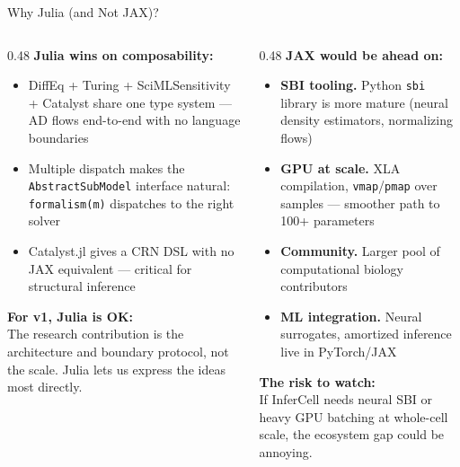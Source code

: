 \documentclass[aspectratio=169]{beamer}
\newcommand{\backupend}{
	\setcounter{framenumber}{\value{framenumberappendix}}
}
\begin{document}

\begin{frame}[noframenumbering]{Why Julia (and Not JAX)?}
	\small
	\begin{columns}[T]
		\begin{column}{0.48\textwidth}
			\textbf{Julia wins on composability:}
			\scriptsize
			\begin{itemize}\itemsep3pt
				\item DiffEq + Turing + SciMLSensitivity + Catalyst share one type system --- AD flows end-to-end with no language boundaries
				\item Multiple dispatch makes the \texttt{AbstractSubModel} interface natural: \texttt{formalism(m)} dispatches to the right solver
				\item Catalyst.jl gives a CRN DSL with no JAX equivalent --- critical for structural inference
			\end{itemize}

			\textbf{For v1, Julia is OK:}\\
			{\scriptsize The research contribution is the architecture and boundary protocol, not the scale. Julia lets us express the ideas most directly.}
		\end{column}
		\begin{column}{0.48\textwidth}
			\textbf{JAX would be ahead on:}
			\scriptsize
			\begin{itemize}\itemsep3pt
				\item \textbf{SBI tooling.} Python \texttt{sbi} library is more mature (neural density estimators, normalizing flows)
				\item \textbf{GPU at scale.} XLA compilation, \texttt{vmap}/\texttt{pmap} over samples --- smoother path to 100+ parameters
				\item \textbf{Community.} Larger pool of computational biology contributors
				\item \textbf{ML integration.} Neural surrogates, amortized inference live in PyTorch/JAX
			\end{itemize}

			\medskip
			\textbf{The risk to watch:}\\
			{\scriptsize If InferCell needs neural SBI or heavy GPU batching at whole-cell scale, the ecosystem gap could be annoying.}
		\end{column}
	\end{columns}
\end{frame}

\backupend
\end{document}
